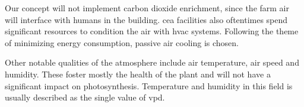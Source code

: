 Our concept will not implement carbon dioxide enrichment, since the farm air will interface with humans in the building.
\ac{cea} facilities also oftentimes spend significant resources to condition the air with \ac{hvac} systems.
Following the theme of minimizing energy consumption, passive air cooling is chosen.

Other notable qualities of the atmosphere include air temperature, air speed and humidity.
These foster mostly the health of the plant and will not have a significant impact on photosynthesis.
Temperature and humidity in this field is usually described as the single value of \ac{vpd}.

